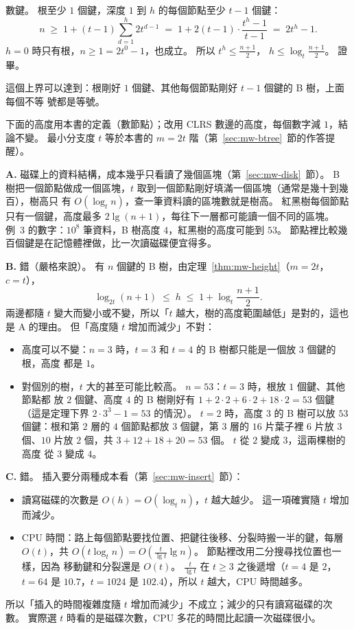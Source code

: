數鍵。 根至少 $1$ 個鍵，深度 $1$ 到 $h$ 的每個節點至少 $t - 1$ 個鍵：
\[
n \;\ge\; 1 + (t - 1) \sum_{d=1}^{h} 2t^{d-1}
\;=\; 1 + 2(t - 1) \cdot \frac{t^h - 1}{t - 1}
\;=\; 2t^h - 1.
\]
$h = 0$ 時只有根，$n \ge 1 = 2t^0 - 1$，也成立。 所以 $t^h \le \frac{n+1}{2}$，
$h \le \log_t \frac{n+1}{2}$。 證畢。

這個上界可以達到：根剛好 $1$ 個鍵、其他每個節點剛好 $t - 1$ 個鍵的 B 樹，上面每個不等
號都是等號。

下面的高度用本書的定義（數節點）；改用 CLRS 數邊的高度，每個數字減 $1$，結論不變。
最小分支度 $t$ 等於本書的 $m = 2t$ 階（第~\ref{sec:mw-btree}~節的作答提醒）。

\textbf{A.} 磁碟上的資料結構，成本幾乎只看讀了幾個區塊（第~\ref{sec:mw-disk}~節）。 B
樹把一個節點做成一個區塊，$t$ 取到一個節點剛好填滿一個區塊（通常是幾十到幾百），樹高只
有 $O(\log_t n)$，查一筆資料讀的區塊數就是樹高。 紅黑樹每個節點只有一個鍵，高度最多
$2\lg(n+1)$，每往下一層都可能讀一個不同的區塊。 例~3 的數字：$10^8$ 筆資料，B 樹高度
$4$，紅黑樹的高度可能到 $53$。 節點裡比較幾百個鍵是在記憶體裡做，比一次讀磁碟便宜得多。

\textbf{B.} 錯（嚴格來說）。 有 $n$ 個鍵的 B 樹，由定理~\ref{thm:mw-height}（$m = 2t$，
$c = t$），
\[
\log_{2t}(n + 1) \;\le\; h \;\le\; 1 + \log_t \frac{n + 1}{2}.
\]
兩邊都隨 $t$ 變大而變小或不變，所以「$t$ 越大，樹的高度範圍越低」是對的，這也是 A 的理由。
但「高度隨 $t$ 增加而減少」不對：
\begin{itemize}
\item 高度可以不變：$n = 3$ 時，$t = 3$ 和 $t = 4$ 的 B 樹都只能是一個放 $3$ 個鍵的根，高度
都是 $1$。
\item 對個別的樹，$t$ 大的甚至可能比較高。 $n = 53$：$t = 3$ 時，根放 $1$ 個鍵、其他節點都
放 $2$ 個鍵、高度 $4$ 的 B 樹剛好有 $1 + 2 \cdot 2 + 6 \cdot 2 + 18 \cdot 2 = 53$ 個鍵
（這是定理下界 $2 \cdot 3^3 - 1 = 53$ 的情況）。 $t = 2$ 時，高度 $3$ 的 B 樹可以放
$53$ 個鍵：根和第 $2$ 層的 $4$ 個節點都放 $3$ 個鍵，第 $3$ 層的 $16$ 片葉子裡 $6$ 片放 $3$
個、$10$ 片放 $2$ 個，共 $3 + 12 + 18 + 20 = 53$ 個。 $t$ 從 $2$ 變成 $3$，這兩棵樹的高度
從 $3$ 變成 $4$。
\end{itemize}

\textbf{C.} 錯。 插入要分兩種成本看（第~\ref{sec:mw-insert}~節）：
\begin{itemize}
\item 讀寫磁碟的次數是 $O(h) = O(\log_t n)$，$t$ 越大越少。 這一項確實隨 $t$ 增加而減少。
\item CPU 時間：路上每個節點要找位置、把鍵往後移、分裂時搬一半的鍵，每層 $O(t)$，共
$O(t \log_t n) = O\!\left(\frac{t}{\lg t} \lg n\right)$。 節點裡改用二分搜尋找位置也一樣，因為
移動鍵和分裂還是 $O(t)$。 $\frac{t}{\lg t}$ 在 $t \ge 3$ 之後遞增（$t = 4$ 是 $2$，$t = 64$ 是
$10.7$，$t = 1024$ 是 $102.4$），所以 $t$ 越大，CPU 時間越多。
\end{itemize}
所以「插入的時間複雜度隨 $t$ 增加而減少」不成立；減少的只有讀寫磁碟的次數。 實際選 $t$
時看的是磁碟次數，CPU 多花的時間比起讀一次磁碟很小。

